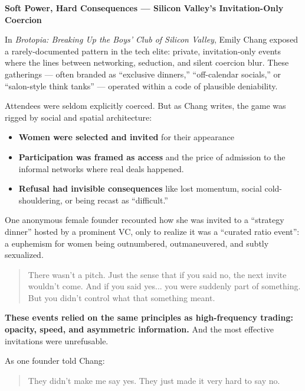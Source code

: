 \begin{HistoricalSidebar}{\textbf{Soft Power, Hard Consequences --- Silicon Valley's Invitation-Only Coercion}}

    In \textit{Brotopia: Breaking Up the Boys’ Club of Silicon Valley}, Emily Chang exposed a rarely-documented 
    pattern in the tech elite: private, invitation-only events where the lines between networking, seduction, and 
    silent coercion blur. These gatherings --- often branded as ``exclusive dinners,'' ``off-calendar socials,''
    or ``salon-style think tanks'' --- operated within a code of plausible deniability.
    
    \medskip
    
    Attendees were seldom explicitly coerced. But as Chang writes, the game was rigged by social and spatial 
    architecture:

    \medskip
    
    
    \begin{itemize}
        \item \textbf{Women were selected and invited} for their appearance
        \item \textbf{Participation was framed as access} and the price of admission to the informal networks 
        where real deals happened.
        \item \textbf{Refusal had invisible consequences} like lost momentum, social cold-shouldering, or being recast 
        as “difficult.”
    \end{itemize}
    
    \medskip
    
    One anonymous female founder recounted how she was invited to a ``strategy dinner'' hosted by a prominent VC, 
    only to realize it was a ``curated ratio event'': a euphemism for women being outnumbered, outmaneuvered, 
    and subtly sexualized.
    
    \begin{quote}
        There wasn’t a pitch. Just the sense that if you said no, the next invite wouldn’t come. 
        And if you said yes... you were suddenly part of something. But you didn’t control what 
        that something meant.
    \end{quote}
    
    \medskip
    
    \textbf{These events relied on the same principles as 
    high-frequency trading: opacity, speed, and asymmetric information.} And the most effective invitations 
    were unrefusable.
    
    \medskip
    
    As one founder told Chang:
    
    \begin{quote}
        They didn’t make me say yes. They just made it very hard to say no.
    \end{quote}
    
\end{HistoricalSidebar}


